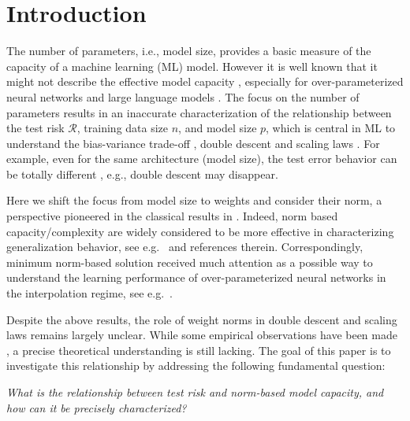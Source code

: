 \section{Introduction}
The number of parameters, i.e., model size, provides a basic measure of the capacity of a machine learning (ML) model.
However it is well known that it might not describe the effective model capacity \citep{bartlett1998sample}, especially for over-parameterized neural networks \citep{belkin2018understand,zhang2021understanding} and large language models \citep{brown2020language}.
The focus on the number of parameters results in an inaccurate characterization of the relationship between the test risk $\mathcal{R}$,  training data size $n$, and model size $p$, which is central in ML to understand the bias-variance trade-off \citep{Vapnik2000The}, double descent \citep{belkin2019reconciling} and scaling laws \citep{kaplan2020scaling,xiao2024rethinking}.
For example, even for the same architecture (model size), the test error behavior can be totally different \citep{nakkiran2020optimal,nakkiran2021deep}, e.g., double descent may disappear.

Here we shift the focus from model size to weights and consider their norm, a perspective pioneered in the classical results in \citet{bartlett1998sample}. Indeed, norm based capacity/complexity are widely considered to be more effective in characterizing generalization behavior, see e.g.\ \citet{neyshabur2015norm,savarese2019infinite,domingo2022tighter,liu2024learning} and references therein.
Correspondingly, minimum norm-based solution received much attention as a possible way to understand the learning performance of over-parameterized neural networks in the interpolation regime, see e.g.\ 
\citet{liang2020just,wang2022tight,belkin2018understand,zhang2021understanding,nakkiran2021deep}.

Despite the above results, the role of weight norms in double descent and scaling laws remains largely unclear. While some empirical observations have been made \citep[Fig. 8.12]{ngcs229}, a precise theoretical understanding is still lacking. The goal of this paper is to investigate this relationship by addressing the following fundamental question:

\begin{center}\vspace{-0.cm}
    \emph{What is the relationship between test risk and norm-based model capacity, and how can it be precisely characterized?} 
\end{center}\vspace{-0.cm}

